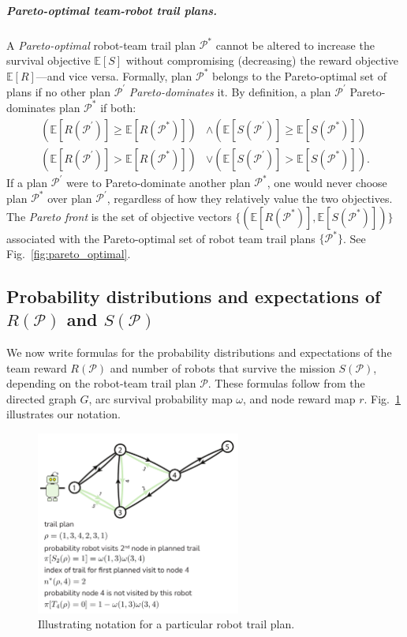 \documentclass[11pt, oneside]{article}
\begin{document}
\subparagraph{Pareto-optimal team-robot trail plans.} 
A \emph{Pareto-optimal} \cite{pardalos2017non,branke2008multiobjective} robot-team trail plan $\mathcal{P}^*$ cannot be altered to increase the survival objective $\mathbb{E}[S]$ without compromising (decreasing) the reward objective $\mathbb{E}[R]$---and vice versa. 
Formally, plan $\mathcal{P}^*$ belongs to the Pareto-optimal set of plans if no other plan $\mathcal{P}^\prime$ \emph{Pareto-dominates} it. By definition, a plan $\mathcal{P}^\prime$ Pareto-dominates plan $\mathcal{P}^*$ if both:
\begin{align}
	\left (\mathbb{E}[R(\mathcal{P}^\prime)] \geq \mathbb{E}[R(\mathcal{P}^*)]  \right) & \wedge \left( \mathbb{E}[S(\mathcal{P}^\prime)] \geq \mathbb{E}[S(\mathcal{P}^*)] \right) \\
	\left( \mathbb{E}[R(\mathcal{P}^\prime)] > \mathbb{E}[R(\mathcal{P}^*)] \right) & \vee \left( \mathbb{E}[S(\mathcal{P}^\prime)] > \mathbb{E}[S(\mathcal{P}^*)] \right).
\end{align}
If a plan $\mathcal{P}^\prime$ were to Pareto-dominate another plan $\mathcal{P}^*$, one would never choose plan $\mathcal{P}^*$ over plan $\mathcal{P}^\prime$, regardless of how they relatively value the two objectives. The \emph{Pareto front} is the set of objective vectors $\{(\mathbb{E}[R(\mathcal{P}^*)], \mathbb{E}[S(\mathcal{P}^*)])\}$ associated with the Pareto-optimal set of robot team trail plans $\{\mathcal{P}^*\}$. See Fig.~\ref{fig:pareto_optimal}. 

\subsection{Probability distributions and expectations of $R(\mathcal{P})$ and $S(\mathcal{P})$}
We now write formulas for the probability distributions and expectations of the team reward $R(\mathcal{P})$ and number of robots that survive the mission $S(\mathcal{P})$, depending on the robot-team trail plan $\mathcal{P}$. 
These formulas follow from the directed graph $G$, arc survival probability map $\omega$, and node reward map $r$. Fig.~\ref{fig:notation} illustrates our notation.

\begin{figure}[h!]
    \centering
    	\includegraphics[width=0.6\textwidth]{drawings/notation_fig/notation.pdf}
    \caption{Illustrating notation for a particular robot trail plan.} \label{fig:notation}
\end{figure}
\end{document}
